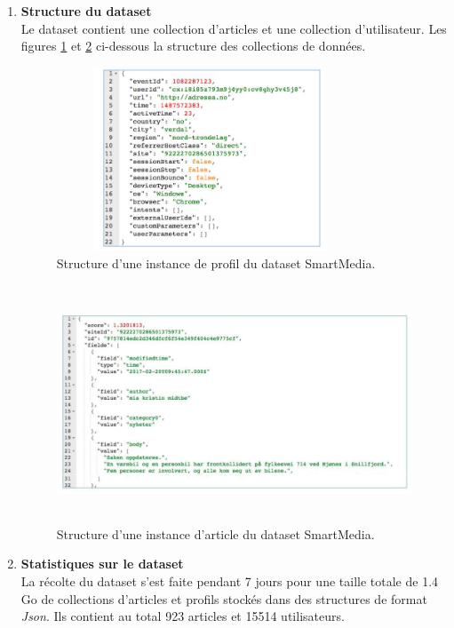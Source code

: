     \begin{enumerate}[leftmargin=*]
        \item\textbf{Structure du dataset}\\
        Le dataset contient une collection d'articles et une collection d'utilisateur. Les figures \ref{instance-profil} et \ref{instance-article} ci-dessous la structure des collections de données.
        \begin{figure}[H]
            \centering
            \includegraphics[height=155pt,width=260pt]{img/chapter4/smartmedia/structure_profil.jpg}
            \caption{Structure d'une instance de profil du dataset SmartMedia.}
            \label{instance-profil}
        \end{figure}
        
        \begin{figure}[H]
            \centering
            \includegraphics[height=200pt,width=330pt]{img/chapter4/smartmedia/structure.png}
            \caption{Structure d'une instance d'article du dataset SmartMedia.}
            \label{instance-article}
        \end{figure}

        \item\textbf{Statistiques sur le dataset}\\
        La récolte du dataset s'est faite pendant 7 jours pour une taille totale de 1.4 Go de collections d'articles et profils stockés dans des structures de format \emph{Json}. Ils contient au total 923 articles et 15514 utilisateurs.\\


\end{enumerate}
